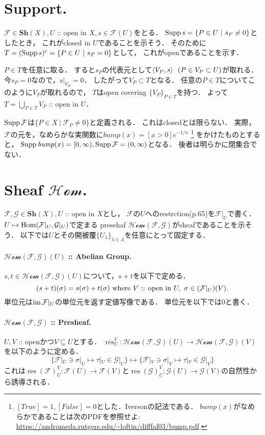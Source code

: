 \documentclass[a4paper]{jsarticle}
\newcommand{\shF}{\mathcal{F}}
\newcommand{\shG}{\mathcal{G}}
\newcommand{\Sh}{\mathbf{Sh}}
\newcommand{\shHom}{\mathscr{H\!o\!m}}
\newcommand{\res}{\operatorname{res}}
\newcommand{\OpenIn}{\text{ :: open in }}
\begin{document}
\section{Support.} %
    $\shF \in \Sh(X), U \OpenIn X, s \in \shF(U)$をとる．
    $\operatorname{Supp} s=\{ P \in U ~|~ s_P \neq 0 \}$としたとき，
    これがclosed in $U$であることを示そう．
    そのために$T=(\operatorname{Supp} s)^c=\{ P \in U ~|~ s_P=0 \}$として，
    これがopenであることを示す．

    $P \in T$を任意に取る．
    すると$s_P$の代表元として$\langle V_P,s \rangle~~(P \in V_P \subset U)$が取れる．
    今$s_P=0$なので，$s|_{V_P}=0$．
    したがって$V_P \subset T$となる．
    任意の$P \in T$についてこのように$V_P$が取れるので，
    $T$はopen covering $\{V_P\}_{P \in T}$を持つ．
    よって$T=\bigcup_{P \in T} V_P$ :: open in $U$．

    $\Supp \shF$は$\{P \in X ~|~ \shF_P \neq 0 \}$と定義される．
    これはclosedとは限らない．
    実際，$\shF$の元を，なめらかな実関数に$\mathit{bump}(x)=[x>0]e^{-1/x}$
    \footnote
    {
        $[True]=1, [False]=0$とした．Iversonの記法である．
        $\mathit{bump}(x)$がなめらかであることは次のPDFを参照せよ: \url{https://andromeda.rutgers.edu/~loftin/difffal03/bump.pdf}.
    }
    をかけたものとすると，
    $\Supp \mathit{bump}(x)=[0,\infty), \Supp \shF=(0,\infty)$となる．
    後者は明らかに閉集合でない．

\section{Sheaf $\shHom$.} %
    $\shF, \shG \in \Sh(X), U \OpenIn X$とし，
    $\shF$の$U$へのrestrction(p.65)を$\shF|_U$で書く．
    $U \mapsto \Hom(\shF|_U, \shG|_U)$で定まる
    presehaf $\shHom(\shF, \shG)$がsheafであることを示そう．
    以下では$U$とその開被覆$\{U_{\lambda}\}_{\lambda \in \Lambda}$を任意にとって固定する．

    \paragraph{$\shHom(\shF, \shG)(U)$ :: Abelian Group.}
    $s,t \in \shHom(\shF, \shG)(U)$について，$s+t$を以下で定める．
    \[ (s+t)(\sigma)=s(\sigma)+t(\sigma) \mwhere V \OpenIn U,~ \sigma \in (\shF|_U)(V). \]
    単位元は$\im \shF|_U$の単位元を返す定値写像である．
    単位元を以下では0と書く．

    \paragraph{$\shHom(\shF, \shG)$ :: Presheaf.}
    $U,V$ :: openかつ$V \subseteq U$とする．
    $\overline{\res}_U^V: \shHom(\shF, \shG)(U) \to \shHom(\shF, \shG)(V)$を以下のように定める．
    \[ \{ \shF|_U \ni \sigma|_U \mapsto \tau|_U \in \shG|_U \} \mapsto \{ \shF|_V \ni \sigma|_V \mapsto \tau|_V \in \shG|_V \} \]
    これは$\res(\shF)_U^V: \shF(U) \to \shF(V)$と$\res(\shG)_U^V: \shG(U) \to \shG(V)$の自然性から誘導される．
\end{document}
